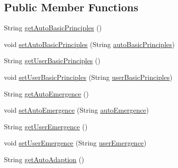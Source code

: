 \subsection*{Public Member Functions}
\begin{DoxyCompactItemize}
\item 
String \hyperlink{classit_1_1isislab_1_1masonhelperdocumentation_1_1_o_d_d_1_1_design_concepts_adb4dd71450f8f1b5ad54a68b63a8662b}{get\-Auto\-Basic\-Principles} ()
\item 
void \hyperlink{classit_1_1isislab_1_1masonhelperdocumentation_1_1_o_d_d_1_1_design_concepts_a19c4d24937bd3d86da8b59308b47f3ba}{set\-Auto\-Basic\-Principles} (String \hyperlink{classit_1_1isislab_1_1masonhelperdocumentation_1_1_o_d_d_1_1_design_concepts_aa5a0af5b9002ffab0de5e9a219b39f8d}{auto\-Basic\-Principles})
\item 
String \hyperlink{classit_1_1isislab_1_1masonhelperdocumentation_1_1_o_d_d_1_1_design_concepts_ad4aa2370f8c035f66390e76db518ffcf}{get\-User\-Basic\-Principles} ()
\item 
void \hyperlink{classit_1_1isislab_1_1masonhelperdocumentation_1_1_o_d_d_1_1_design_concepts_ac73d2fb492849360c3c4f8dfb99f263a}{set\-User\-Basic\-Principles} (String \hyperlink{classit_1_1isislab_1_1masonhelperdocumentation_1_1_o_d_d_1_1_design_concepts_a8ef2c3be72c0336a64cdabbd91e82e07}{user\-Basic\-Principles})
\item 
String \hyperlink{classit_1_1isislab_1_1masonhelperdocumentation_1_1_o_d_d_1_1_design_concepts_acf594edfcc4e9666c82b2ff201902e3e}{get\-Auto\-Emergence} ()
\item 
void \hyperlink{classit_1_1isislab_1_1masonhelperdocumentation_1_1_o_d_d_1_1_design_concepts_acaf605cd934578b681e95e0a31fb715d}{set\-Auto\-Emergence} (String \hyperlink{classit_1_1isislab_1_1masonhelperdocumentation_1_1_o_d_d_1_1_design_concepts_ab6e30191f9a5ecf4370bbbf5f9fe7eed}{auto\-Emergence})
\item 
String \hyperlink{classit_1_1isislab_1_1masonhelperdocumentation_1_1_o_d_d_1_1_design_concepts_a47940c6e8a2b76b6058bf2eb1273101b}{get\-User\-Emergence} ()
\item 
void \hyperlink{classit_1_1isislab_1_1masonhelperdocumentation_1_1_o_d_d_1_1_design_concepts_a3d37971fb6c38bed0cb73d342165de96}{set\-User\-Emergence} (String \hyperlink{classit_1_1isislab_1_1masonhelperdocumentation_1_1_o_d_d_1_1_design_concepts_a7a97f8bdb7fac0f86e4d070911eb07d0}{user\-Emergence})
\item 
String \hyperlink{classit_1_1isislab_1_1masonhelperdocumentation_1_1_o_d_d_1_1_design_concepts_a93372a5bd13f71388909f6ca6ef7894f}{get\-Auto\-Adaption} ()

\end{DoxyCompactItemize}
